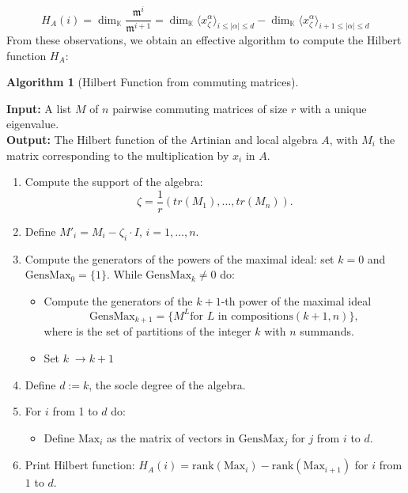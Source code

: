 \documentclass[a4paper,11p]{amsart}
\newcommand{\m}{\mathfrak m}
\newtheorem{alg}{Algorithm}
\newcommand{\K}{\mathbb K}
\begin{document}
\[H_A(i)=\dim_{\K} \frac{\m^{i}}{\m^{i+1}}=\dim_{\K} \langle x_{\zeta}^{\alpha}\rangle_{i\leq |\alpha|\leq d} - \dim_{\K} \langle x_{\zeta}^{\alpha}\rangle_{i+1\leq |\alpha|\leq d}\]
From these observations, we obtain an effective algorithm to compute the Hilbert function $H_A$:
\vspace{0.5cm}
\begin{mdframed}[]
\begin{alg}[Hilbert Function from commuting matrices]\label{alg:HF}\end{alg}
\vspace{0.1cm}
\noindent\textbf{Input:} A list $M$ of $n$ pairwise commuting matrices  of size $r$ with a unique eigenvalue. \\
    \textbf{Output:} The Hilbert function of the Artinian and local algebra $A$, with $M_i$ the matrix corresponding to the multiplication by $x_i$ in $A$.

 \begin{enumerate}
     \item Compute the support of the algebra: $$\zeta=\frac{1}{r}(tr(M_1),\ldots,tr(M_n)).$$
     \item Define $M'_i = M_i - \zeta_i\cdot I$, $i=1,\ldots, n$.
     \item Compute the generators of the powers of the maximal ideal: set $k=0$ and $\text{GensMax}_0= \{1\}$. While $\text{GensMax}_k \neq 0$ do:

    
     
     \begin{itemize}
         \item Compute the generators of the $k+1$-th power of the maximal ideal $$\text{GensMax}_{k+1}= \{M^L \text{for $L$ in compositions$(k+1,n)$}\},$$ where  is the set of partitions of the integer $k$ with $n$ summands. 
         \item Set $k \; \rightarrow k+1$
     \end{itemize}

     \item Define $d:=k$, the socle degree of the algebra.
     \item For $i$ from 1 to $d$ do:
     \begin{itemize}
         \item Define $\text{Max}_i$ as the matrix of vectors in $\text{GensMax}_j$ for $j$ from $i$ to $d$. 
     \end{itemize}
     \item Print Hilbert function: $H_A(i)=\text{rank}(\text{Max}_i)-\text{rank}(\text{Max}_{i+1})$ for $i$ from $1$ to $d$.
     \end{enumerate}
\end{mdframed}
\vspace{0.5cm}
\end{document}
